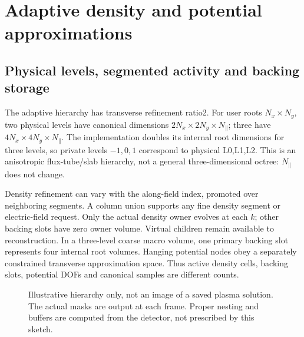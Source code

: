 \section{Adaptive density and potential approximations}
\subsection{Physical levels, segmented activity and backing storage}
The adaptive hierarchy has transverse refinement ratio2. For user roots
$N_x\times N_y$, two physical levels have canonical dimensions
$2N_x\times2N_y\times N_\parallel$; three have
$4N_x\times4N_y\times N_\parallel$. The implementation doubles its internal root
dimensions for three levels, so private levels $-1,0,1$ correspond to
physical L0,L1,L2. This is an anisotropic flux-tube/slab hierarchy, not a
general three-dimensional octree: $N_\parallel$ does not change.

Density refinement can vary with the along-field index, promoted over
 neighboring segments. A column union supports any
fine density segment or electric-field request. Only the actual density
owner evolves at each $k$; other backing slots have zero owner volume.
Virtual children remain available to reconstruction. In a three-level
coarse macro volume, one primary backing slot represents four internal
root volumes. Hanging potential nodes obey a separately constrained
transverse approximation space. Thus active density cells, backing slots,
potential DOFs and canonical samples are different counts.

\begin{figure}[ht]
\centering
{}
\caption{Illustrative hierarchy only, not an image of a saved plasma solution.
The actual masks are output at each frame. Proper nesting and buffers are
computed from the detector, not prescribed by this sketch.}
\end{figure}

